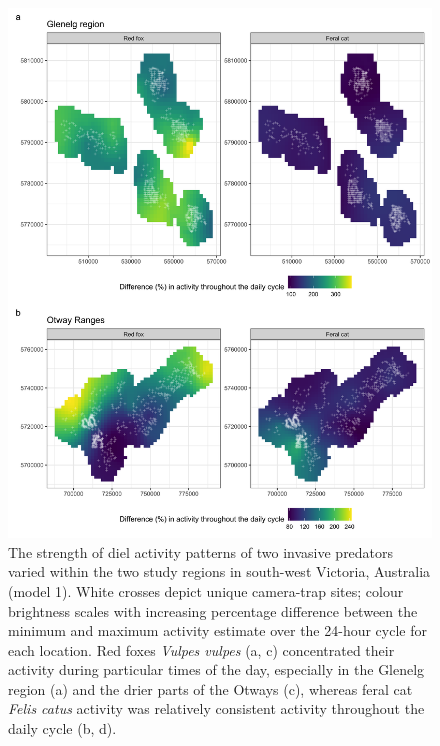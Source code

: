\documentclass[11pt,a4paper,titlepage,twoside,openright]{style/unimelbthesis}
\begin{document}
\begin{mainmatter}
\begin{figure}
{\centering \includegraphics[width=1\linewidth]{figure/diel_strength_600dpi} 

}

\caption{The strength of diel activity patterns of two invasive predators varied within the two study regions in south-west Victoria, Australia (model 1). White crosses depict unique camera-trap sites; colour brightness scales with increasing percentage difference between the minimum and maximum activity estimate over the 24-hour cycle for each location. Red foxes \textit{Vulpes vulpes} (a, c) concentrated their activity during particular times of the day, especially in the Glenelg region (a) and the drier parts of the Otways (c), whereas feral cat \textit{Felis catus} activity was relatively consistent activity throughout the daily cycle (b, d).}\label{fig:diel-space}
\end{figure}
\newpage
\begin{figure}


\end{figure}
\end{mainmatter}
\end{document}
